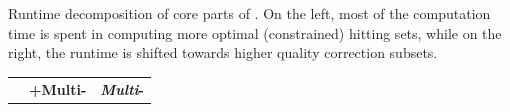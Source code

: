 \begin{landscape}
\begin{table}[!h]
		\caption{Runtime decomposition of core parts of . On the left, most of the computation time is spent in computing more optimal (constrained) hitting sets, while on the right, the runtime is shifted towards higher quality correction subsets.}
		\label{tab:runtime-decomposition-corr-susbet-enum}
	\end{table}
	\vspace*{\fill}
	\begin{table}[!h]
		\centering
		\begin{adjustbox}{max width=1.4\textwidth}
			\begin{tabular}{r|c|c|cccccc|c|c|cccccc}
				& \multicolumn{8}{c|}{\textbf{\maxsat+Multi-\sat}} & \multicolumn{8}{c}{\textbf{\emph{Multi}-\subsetmaxsat}}\\[1ex]

\end{tabular}
\end{adjustbox}
\end{table}
\end{landscape}
